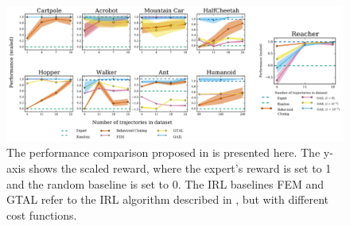 \begin{figure}[tb]
    
    \includegraphics[width=\textwidth]{figures/images/gail_performance.jpg}
    \caption{The performance comparison proposed in \cite{ho2016gail} is presented here. The y-axis shows the scaled reward, where the expert's reward is set to 1 and the random baseline is set to 0. The IRL baselines FEM and GTAL refer to the IRL algorithm described in \cite{ho2016model}, but with different cost functions.}
    \label{fig:gail_performance}
    
\end{figure}
